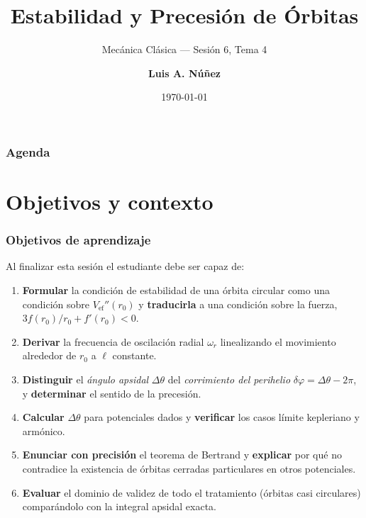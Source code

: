 \documentclass[10pt]{beamer}
\newcommand{\Vef}{V_{\mathrm{ef}}}
\newcommand{\dth}{\Delta\theta}          %
\newcommand{\dph}{\delta\varphi}         %
\begin{document}
\title[Estabilidad y Precesión]{\textbf{Estabilidad y Precesión de Órbitas}}
\subtitle{Mecánica Clásica --- Sesión 6, Tema 4}
\author[L.A. Núñez]{\textbf{Luis A. Núñez}}
\date{\today}

\begin{frame}[plain]
  \titlepage
\end{frame}

\begin{frame}
  \frametitle{Agenda}
  \tableofcontents
\end{frame}

\section{Objetivos y contexto}

\begin{frame}
\frametitle{Objetivos de aprendizaje}
Al finalizar esta sesión el estudiante debe ser capaz de:
\begin{enumerate}
  \item<1-> \textbf{Formular} la condición de estabilidad de una órbita circular
        como una condición sobre $\Vef''(r_0)$ y \textbf{traducirla} a una
        condición sobre la fuerza, $3f(r_0)/r_0+f'(r_0)<0$.
  \item<2-> \textbf{Derivar} la frecuencia de oscilación radial $\omega_r$
        linealizando el movimiento alrededor de $r_0$ a $\ell$ constante.
  \item<3-> \textbf{Distinguir} el \emph{ángulo apsidal} $\dth$ del
        \emph{corrimiento del perihelio} $\dph=\dth-2\pi$, y
        \textbf{determinar} el sentido de la precesión.
  \item<4-> \textbf{Calcular} $\dth$ para potenciales dados y
        \textbf{verificar} los casos límite kepleriano y armónico.
  \item<5-> \textbf{Enunciar con precisión} el teorema de Bertrand y
        \textbf{explicar} por qué no contradice la existencia de órbitas
        cerradas particulares en otros potenciales.
  \item<6-> \textbf{Evaluar} el dominio de validez de todo el tratamiento
        (órbitas casi circulares) comparándolo con la integral apsidal exacta.
\end{enumerate}
\end{frame}
\end{document}
